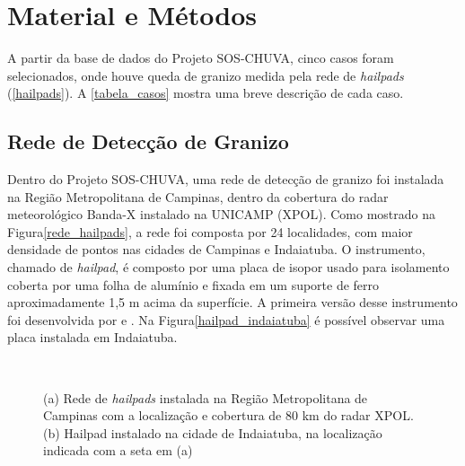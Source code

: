 \chapter{Material e Métodos}\label{database}

A partir da base de dados do Projeto SOS-CHUVA, cinco casos foram selecionados, onde houve queda de granizo medida pela rede de \textit{hailpads} (\autoref{hailpads}). A \autoref{tabela_casos} mostra uma breve descrição de cada caso.



\section{Rede de Detecção de Granizo}\label{hailpads}

Dentro do Projeto SOS-CHUVA, uma rede de detecção de granizo foi instalada na Região Metropolitana de Campinas, dentro da cobertura do radar meteorológico Banda-X instalado na UNICAMP (XPOL). Como mostrado na Figura\autoref{rede_hailpads}, a rede foi composta por 24 localidades, com maior densidade de pontos nas cidades de Campinas e Indaiatuba. O instrumento, chamado de \textit{hailpad}, é composto por uma placa de isopor usado para isolamento coberta por uma folha de alumínio e fixada em um suporte de ferro aproximadamente 1,5 m acima da superfície. A primeira versão desse instrumento foi desenvolvida por  e . Na Figura\autoref{hailpad_indaiatuba} é possível observar uma placa instalada em Indaiatuba.

\begin{figure}[htb]
	\begin{center}
		\caption{(a) Rede de \textit{hailpads} instalada na Região Metropolitana de Campinas com a localização e cobertura de 80 km do radar XPOL. (b) Hailpad instalado na cidade de Indaiatuba, na localização indicada com a seta em (a)} 
		\label{overview_hailpads}
		\ \
		\\
	\end{center}
\end{figure}

